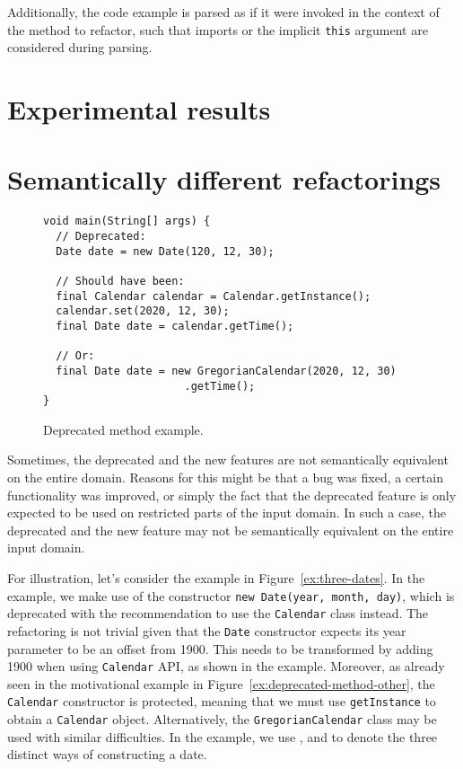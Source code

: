 \documentclass[sigconf,review,anonymous]{acmart}
\begin{document}
Additionally, the code example is parsed as if it were invoked in the context of
the method to refactor, such that imports or the implicit \texttt{this} argument
are considered during parsing.

\section{Experimental results}\label{sec:experimental-results}

\section{Semantically different refactorings}


\begin{figure}
\begin{lstlisting}[mathescape=true,showstringspaces=false]
void main(String[] args) {
  // Deprecated:
  Date date = new Date(120, 12, 30);
 
  // Should have been:
  final Calendar calendar = Calendar.getInstance();
  calendar.set(2020, 12, 30);
  final Date date = calendar.getTime();

  // Or:
  final Date date = new GregorianCalendar(2020, 12, 30)
                      .getTime();
}
\end{lstlisting}
\caption{Deprecated method example.}
\label{ex:deprecated-method}
\end{figure}


Sometimes, the deprecated and the new features are not semantically
equivalent on the entire domain. Reasons for this might be that a bug
was fixed, a certain functionality was improved, or simply the fact
that the deprecated feature is only expected to be used on restricted
parts of the input domain. In such a case, the deprecated and the new
feature may not be semantically equivalent on the entire input domain.

For illustration, let's consider the example in Figure~\ref{ex:three-dates}.
In the example, we make use of the constructor \texttt{new Date(year, month, day)}, 
which is deprecated with the 
recommendation to use the \texttt{Calendar} class instead.
The refactoring is not trivial given that the 
\texttt{Date} constructor expects its year parameter to be an offset
from 1900.  This needs to be
transformed by adding 1900 when using \texttt{Calendar} API, as shown in the
example. Moreover, as already seen in the motivational example in  Figure~\ref{ex:deprecated-method-other},
the \texttt{Calendar} constructor is protected,
meaning that we must use \texttt{getInstance} to obtain a
\texttt{Calendar} object.
Alternatively, the \texttt{GregorianCalendar} class may be used with
similar difficulties.
In the example, we use ,  and  to denote the three distinct ways of constructing a date.
\end{document}
